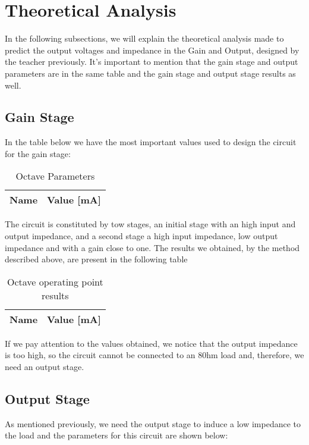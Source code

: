 \section{Theoretical Analysis}
\label{sec:analysis}

In the following subsections, we will explain the theoretical analysis made to predict the output voltages and impedance in the Gain and Output, designed by the teacher previously.
It's important to mention that the gain stage and output parameters are in the same table and the gain stage and output stage results as well.

\subsection{Gain Stage}

In the table below we have the most important values used to design the circuit for the gain stage:
\begin{table}[H]
	\centering
	\begin{tabular}{|l|r|}
		\hline    
		{\bf Name} & {\bf Value [mA]} \\ \hline
		
	\end{tabular}
	\caption{Octave Parameters}
	\label{tab:op}
\end{table}

The circuit is constituted by tow stages, an initial stage with an high input and output impedance, and a second stage a high input impedance, low output impedance and with a gain close to one.
The results we obtained, by the method described above, are present in the following table
\begin{table}[H]
	\centering
	\begin{tabular}{|l|r|}
		\hline    
		{\bf Name} & {\bf Value [mA]} \\ \hline
		
	\end{tabular}
	\caption{Octave operating point results}
	\label{tab:op}
\end{table}
	
If we pay attention to the values obtained, we notice that the output impedance is too high, so the circuit cannot be connected to an 80hm load and, therefore, we need an output stage.
\subsection{Output Stage}
As mentioned previously, we need the output stage to induce a low impedance to the load and the parameters for this circuit are shown below:

